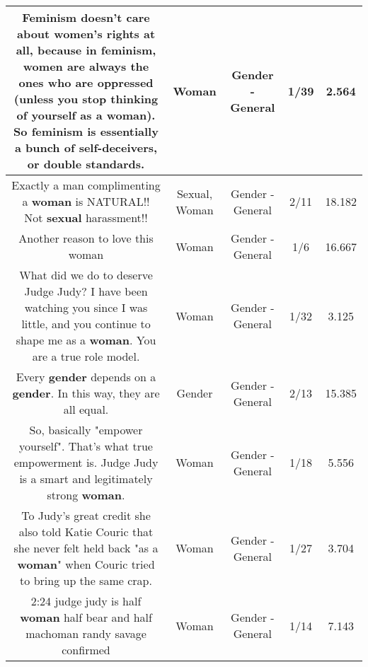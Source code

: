 \documentclass[11pt]{article}
\newlength\mylength
\begin{document}
\begin{center}
\begin{longtable}{|C{.65\mylength}|C{.30\mylength}|C{.12\mylength}|C{.12\mylength}|C{.12\mylength}|}
  \small Feminism doesn't care about women's rights at all, because in feminism, women are always the ones who are oppressed (unless you stop thinking of yourself as a \textbf{woman}). So feminism is essentially a bunch of self-deceivers, or double standards.\normalsize   & Woman & Gender - General & 1/39 & 2.564 \\  \hline
  \small Exactly a man complimenting a \textbf{woman} is NATURAL!! Not \textbf{sexual} harassment!!\normalsize   & Sexual, Woman & Gender - General & 2/11 & 18.182 \\  \hline
  \small Another reason to love this woman\normalsize   & Woman & Gender - General & 1/6 & 16.667 \\  \hline
  \small What did we do to deserve Judge Judy? I have been watching you since I was little, and you continue to shape me as a \textbf{woman}. You are a true role model.\normalsize   & Woman & Gender - General & 1/32 & 3.125 \\  \hline
  \small Every \textbf{gender} depends on a \textbf{gender}. In this way, they are all equal.\normalsize   & Gender & Gender - General & 2/13 & 15.385 \\  \hline
  \small So, basically "empower yourself". That's what true empowerment is. Judge Judy is a smart and legitimately strong \textbf{woman}.\normalsize   & Woman & Gender - General & 1/18 & 5.556 \\  \hline
  \small To Judy's great credit she also told Katie Couric that she never felt held back "as a \textbf{woman}" when Couric tried to bring up the same crap.\normalsize   & Woman & Gender - General & 1/27 & 3.704 \\  \hline
  \small 2:24 judge judy is half \textbf{woman} half bear and half machoman randy savage confirmed\normalsize   & Woman & Gender - General & 1/14 & 7.143 \\  \hline

\end{longtable}
\end{center}
\end{document}
